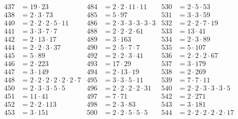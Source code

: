 \begin{align*}
  437&=19\cdot23                             & 484&=2\cdot2\cdot11\cdot11                             & 530&=2\cdot5\cdot53                   \\
  438&=2\cdot3\cdot73                        & 485&=5\cdot97                                          & 531&=3\cdot3\cdot59                   \\
  440&=2\cdot2\cdot2\cdot5\cdot11            & 486&=2\cdot3\cdot3\cdot3\cdot3\cdot3                   & 532&=2\cdot2\cdot7\cdot19             \\
  441&=3\cdot3\cdot7\cdot7                   & 488&=2\cdot2\cdot2\cdot61                              & 533&=13\cdot41                        \\
  442&=2\cdot13\cdot17                       & 489&=3\cdot163                                         & 534&=2\cdot3\cdot89                   \\
  444&=2\cdot2\cdot3\cdot37                  & 490&=2\cdot5\cdot7\cdot7                               & 535&=5\cdot107                        \\
  445&=5\cdot89                              & 492&=2\cdot2\cdot3\cdot41                              & 536&=2\cdot2\cdot2\cdot67             \\
  446&=2\cdot223                             & 493&=17\cdot29                                         & 537&=3\cdot179                        \\
  447&=3\cdot149                             & 494&=2\cdot13\cdot19                                   & 538&=2\cdot269                        \\
  448&=2\cdot2\cdot2\cdot2\cdot2\cdot2\cdot7 & 495&=3\cdot3\cdot5\cdot11                              & 539&=7\cdot7\cdot11                   \\
  450&=2\cdot3\cdot3\cdot5\cdot5             & 496&=2\cdot2\cdot2\cdot2\cdot31                        & 540&=2\cdot2\cdot3\cdot3\cdot3\cdot5  \\
  451&=11\cdot41                             & 497&=7\cdot71                                          & 542&=2\cdot271                        \\
  452&=2\cdot2\cdot113                       & 498&=2\cdot3\cdot83                                    & 543&=3\cdot181                        \\
  453&=3\cdot151                             & 500&=2\cdot2\cdot5\cdot5\cdot5                         & 544&=2\cdot2\cdot2\cdot2\cdot2\cdot17 \\

\end{align*}
